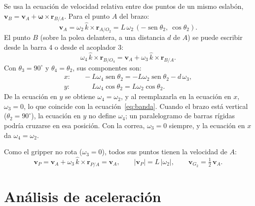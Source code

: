 \documentclass[11pt,a4paper]{article}
\newcommand{\sen}{\operatorname{sen}}
\begin{document}
Se usa la ecuación de velocidad relativa entre dos puntos de un mismo eslabón,
$\mathbf{v}_B=\mathbf{v}_A+\boldsymbol{\omega}\times\mathbf{r}_{B/A}$. Para el punto $A$ del brazo:
\begin{equation}
\mathbf{v}_A=\omega_2\,\hat{k}\times\mathbf{r}_{A/O_2}=L\,\omega_2\,(-\sen\theta_2,\ \cos\theta_2).
\end{equation}
El punto $B$ (sobre la polea delantera, a una distancia $d$ de $A$) se puede escribir desde la
barra 4 o desde el acoplador 3:
\begin{equation}
\omega_4\,\hat{k}\times\mathbf{r}_{B/O_4}=\mathbf{v}_A+\omega_3\,\hat{k}\times\mathbf{r}_{B/A}.
\end{equation}
Con $\theta_3=90^\circ$ y $\theta_4=\theta_2$, sus componentes son:
\begin{align}
x:&\quad -L\omega_4\sen\theta_2=-L\omega_2\sen\theta_2-d\,\omega_3,\\
y:&\quad \phantom{-}L\omega_4\cos\theta_2=L\omega_2\cos\theta_2.
\end{align}
De la ecuación en $y$ se obtiene $\omega_4=\omega_2$, y al reemplazarla en la ecuación en $x$,
$\omega_3=0$, lo que coincide con la ecuación~\eqref{eq:banda}. Cuando el brazo está vertical
($\theta_2=90^\circ$), la ecuación en $y$ no define $\omega_4$; un paralelogramo de barras rígidas
podría cruzarse en esa posición. Con la correa, $\omega_3=0$ siempre, y la ecuación en $x$ da
$\omega_4=\omega_2$.

Como el gripper no rota ($\omega_3=0$), todos sus puntos tienen la velocidad de $A$:
\begin{equation}
\mathbf{v}_P=\mathbf{v}_A+\omega_3\,\hat{k}\times\mathbf{r}_{P/A}=\mathbf{v}_A,\qquad
|\mathbf{v}_P|=L\,|\omega_2|,\qquad \mathbf{v}_{G_2}=\tfrac12\,\mathbf{v}_A.
\end{equation}

\section{Análisis de aceleración}
\end{document}
